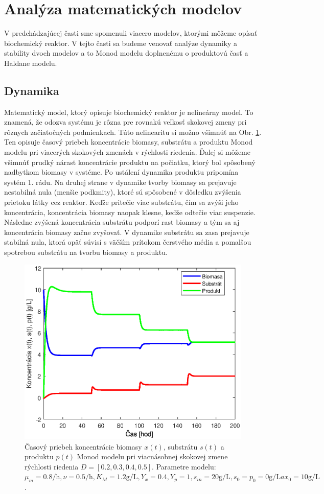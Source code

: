 \section{Analýza matematických modelov}
V predchádzajúcej časti sme spomenuli viacero modelov, ktorými môžeme opísať biochemický reaktor. V tejto časti sa budeme venovať analýze dynamiky a stability dvoch modelov a to Monod modelu doplnenému o produktovú časť a Haldane modelu.

\subsection{Dynamika}
Matematický model, ktorý opisuje biochemický reaktor je nelineárny model. To znamená, že odozva systému je rôzna pre rovnakú veľkosť skokovej zmeny pri rôznych začiatočných podmienkach. Túto nelinearitu si možno všimnúť na Obr. \ref{fig:dyn_monod_ex}. Ten opisuje časový priebeh koncentrácie biomasy, substrátu a produktu Monod modelu pri viacerých skokových zmenách v rýchlosti riedenia. Ďalej si môžeme všimnúť prudký nárast koncentrácie produktu na počiatku, ktorý bol spôsobený nadbytkom biomasy v systéme. Po ustálení dynamika produktu pripomína systém 1. rádu. Na druhej strane v dynamike tvorby biomasy sa prejavuje nestabilná nula (menšie podkmity), ktoré sú spôsobené v dôsledku zvýšenia prietoku látky cez reaktor. Keďže pritečie viac substrátu, čím sa zvýši jeho koncentrácia, koncentrácia biomasy naopak klesne, keďže odtečie viac suspenzie. Následne zvýšená koncentrácia substrátu podporí rast biomasy a tým sa aj koncentrácia biomasy začne zvyšovať. V dynamike substrátu sa zasa prejavuje stabilná nula, ktorá opäť súvisí s väčším prítokom čerstvého média a pomalšou spotrebou substrátu na tvorbu biomasy a produktu.

\begin{figure}
	\centering
	\includegraphics[width=0.7\linewidth]{images/monod_data}
	\caption{Časový priebeh koncentrácie biomasy $ x(t) $, substrátu $ s(t) $ a produktu $ p(t) $ Monod modelu pri viacnásobnej skokovej zmene rýchlosti riedenia $ D = [0.2, 0.3, 0.4, 0.5] $. Parametre modelu: $ \mu_{m} = 0.8\si{\per\hour}, \nu = 0.5\si{\per\hour}, K_{M} = 1.2\si{\gram\per\liter}, Y_{x} = 0.4, Y_{p} = 1, s_{in} = 20\si{\gram\per\liter}, s_0 = p_0 = 0\si{\gram\per\liter} a x_0 = 10\si{\gram\per\liter}$.}
	\label{fig:dyn_monod_ex}
\end{figure}

